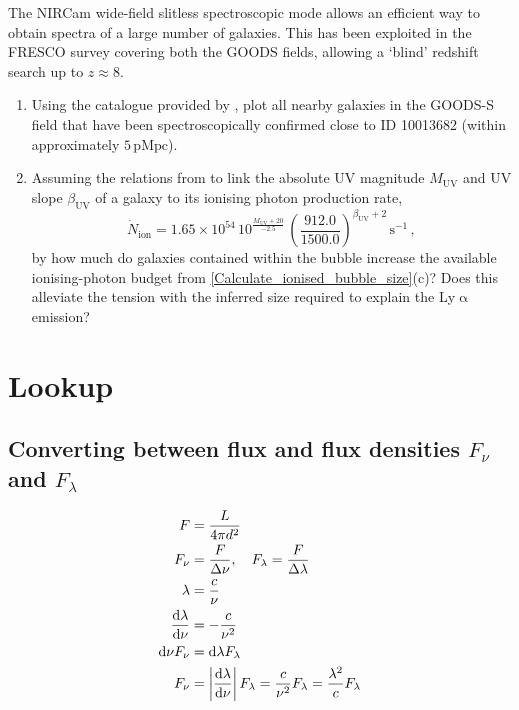 \documentclass{article}
\newcommand{\Lya}{{Ly\ensuremath{\upalpha}}\xspace}
\theoremstyle{definition}
\begin{document}
The NIRCam wide-field slitless spectroscopic mode allows an efficient way to obtain spectra of a large number of galaxies. This has been exploited in the FRESCO survey \citep{2023MNRAS.525.2864O} covering both the GOODS fields, allowing a `blind' redshift search up to $z \approx 8$.
\begin{enumerate}[label=(\alph*)]
    \item Using the catalogue provided by \citet{2024ApJ...974...41H}, plot all nearby galaxies in the GOODS-S field that have been spectroscopically confirmed close to ID 10013682 (within approximately $5 \, \mathrm{pMpc}$).
    \item Assuming the relations from \citet{2020MNRAS.499.1395M} to link the absolute UV magnitude $M_\text{UV}$ and UV slope $\beta_\text{UV}$ of a galaxy to its ionising photon production rate,
    \begin{equation*}
        \dot{N}_\text{ion} = 1.65 \times 10^{54} \, 10^{\frac{M_\text{UV}+20}{-2.5}} \, \left( \frac{912.0}{1500.0} \right)^{\beta_\text{UV} + 2} \, \mathrm{s^{-1}} \, ,
    \end{equation*}
    by how much do galaxies contained within the bubble increase the available ionising-photon budget from \cref{Calculate_ionised_bubble_size}(c)? Does this alleviate the tension with the inferred size required to explain the \Lya emission?
\end{enumerate}



\appendix

\section{Lookup}

\subsection{Converting between flux and flux densities $F_\nu$ and $F_\lambda$}
\label{app:Flux_conversions}

\begin{align*}
    F & = \frac{L}{4 \pi d^2}
    \\
    F_\nu & = \frac{F}{\Delta \nu}, \quad F_\lambda = \frac{F}{\Delta \lambda}
    \\
    \lambda & = \frac{c}{\nu}
    \\
    \frac{\dif \lambda}{\dif \nu} & = - \frac{c}{\nu^2}
    \\
    \dif \nu F_\nu & = \dif \lambda F_\lambda
    \\
    F_\nu & = \left| \frac{\dif \lambda}{\dif \nu} \right| F_\lambda = \frac{c}{\nu^2} F_\lambda = \frac{\lambda^2}{c} F_\lambda
\end{align*}
\end{document}
